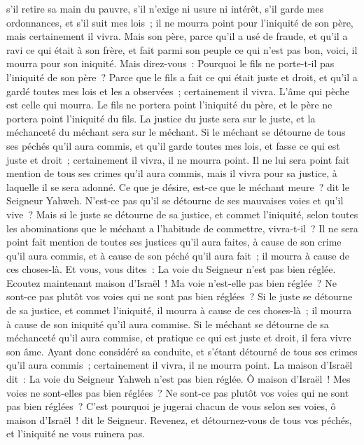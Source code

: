 \begin{multicols}{2}
s'il retire sa main du pauvre, s'il n'exige ni usure ni intérêt, s'il garde mes ordonnances, et s'il suit mes lois~; il ne mourra point pour l'iniquité de son père, mais certainement il vivra.
Mais son père, parce qu'il a usé de fraude, et qu'il a ravi ce qui était à son frère, et fait parmi son peuple ce qui n'est pas bon, voici, il mourra pour son iniquité.
Mais direz-vous~: Pourquoi le fils ne porte-t-il pas l'iniquité de son père~? Parce que le fils a fait ce qui était juste et droit, et qu'il a gardé toutes mes lois et les a observées~; certainement il vivra.
L'âme qui pèche est celle qui mourra. Le fils ne portera point l'iniquité du père, et le père ne portera point l'iniquité du fils. La justice du juste sera sur le juste, et la méchanceté du méchant sera sur le méchant.
Si le méchant se détourne de tous ses péchés qu'il aura commis, et qu'il garde toutes mes lois, et fasse ce qui est juste et droit~; certainement il vivra, il ne mourra point.
Il ne lui sera point fait mention de tous ses crimes qu'il aura commis, mais il vivra pour sa justice, à laquelle il se sera adonné.
Ce que je désire, est-ce que le méchant meure~? dit le Seigneur Yahweh. N'est-ce pas qu'il se détourne de ses mauvaises voies et qu'il vive~?
Mais si le juste se détourne de sa justice, et commet l'iniquité, selon toutes les abominations que le méchant a l'habitude de commettre, vivra-t-il~? Il ne sera point fait mention de toutes ses justices qu'il aura faites, à cause de son crime qu'il aura commis, et à cause de son péché qu'il aura fait~; il mourra à cause de ces choses-là.
Et vous, vous dites~: La voie du Seigneur n'est pas bien réglée. Ecoutez maintenant maison d'Israël~! Ma voie n'est-elle pas bien réglée~? Ne sont-ce pas plutôt vos voies qui ne sont pas bien réglées~?
Si le juste se détourne de sa justice, et commet l'iniquité, il mourra à cause de ces choses-là~; il mourra à cause de son iniquité qu'il aura commise.
Si le méchant se détourne de sa méchanceté qu'il aura commise, et pratique ce qui est juste et droit, il fera vivre son âme.
Ayant donc considéré sa conduite, et s'étant détourné de tous ses crimes qu'il aura commis~; certainement il vivra, il ne mourra point.
La maison d'Israël dit~: La voie du Seigneur Yahweh n'est pas bien réglée. Ô maison d'Israël~! Mes voies ne sont-elles pas bien réglées~? Ne sont-ce pas plutôt vos voies qui ne sont pas bien réglées~?
C'est pourquoi je jugerai chacun de vous selon ses voies, ô maison d'Israël~! dit le Seigneur. Revenez, et détournez-vous de tous vos péchés, et l'iniquité ne vous ruinera pas.

\end{multicols}
